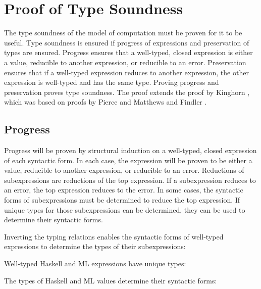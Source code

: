 \chapter{Proof of Type Soundness}

The type soundness of the model of computation must be proven for it to be useful.  Type soundness is ensured if progress of expressions and preservation of types are ensured.  Progress ensures that a well-typed, closed expression is either a value, reducible to another expression, or reducible to an error.  Preservation ensures that if a well-typed expression reduces to another expression, the other expression is well-typed and has the same type.  Proving progress and preservation proves type soundness.  The proof extends the proof by Kinghorn \cite{kinghorn07}, which was based on proofs by Pierce \cite{pierce02} and Matthews and Findler \cite{matthews07}.

\section{Progress}

Progress will be proven by structural induction on a well-typed, closed expression of each syntactic form.  In each case, the expression will be proven to be either a value, reducible to another expression, or reducible to an error.  Reductions of subexpressions are reductions of the top expression.  If a subexpression reduces to an error, the top expression reduces to the error.  In some cases, the syntactic forms of subexpressions must be determined to reduce the top expression.  If unique types for those subexpressions can be determined, they can be used to determine their syntactic forms.

Inverting the typing relations enables the syntactic forms of well-typed expressions to determine the types of their subexpressions:



Well-typed Haskell and ML expressions have unique types:



The types of Haskell and ML values determine their syntactic forms:







